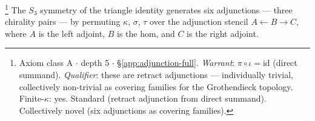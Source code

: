 \begin{theorem}\label{thm:adjunction}\footnote{Axiom class \textsf{A} $\cdot$ depth 5 $\cdot$ \S\ref{app:adjunction-full}.  \emph{Warrant}: $\pi \circ \iota = \mathrm{{id}}$ (direct summand). \emph{Qualifier}: these are retract adjunctions --- individually trivial, collectively non-trivial as covering families for the Grothendieck topology. Finite-$\kappa$: yes. Standard (retract adjunction from direct summand). Collectively novel (six adjunctions as covering families).}
The $S_3$ symmetry of the triangle identity generates six
adjunctions --- three chirality pairs --- by permuting
$\kappa$, $\sigma$, $\tau$ over the adjunction stencil
$A \leftarrow B \to C$, where $A$ is the left adjoint,
$B$ is the hom, and $C$ is the right adjoint.
\end{theorem}

